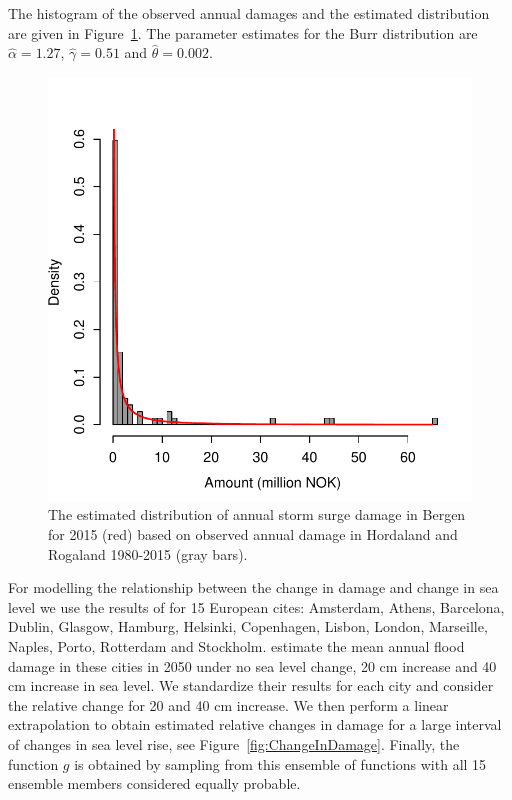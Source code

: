 \documentclass[draft,linenumbers]{agujournal}
\begin{document}
The histogram of the observed annual damages and the estimated distribution are given in Figure~\ref{fig:BergenDamageDist}. The parameter estimates for the Burr distribution are $\hat{\alpha} = 1.27$, $\hat{\gamma} = 0.51$ and $\hat{\theta} = 0.002$. 

\begin{figure}
\begin{center}
\includegraphics[width=0.5\linewidth]{DamageDistribution.pdf}
\caption{ The estimated distribution of annual storm surge damage in Bergen for 2015 (red) based on observed annual damage in Hordaland and Rogaland 1980-2015 (gray bars). }
\label{fig:BergenDamageDist}
\end{center}
\end{figure}


For modelling the relationship between the change in damage and change in sea level we use the results of \cite{Hallegatte&2013} for 15 European cites: Amsterdam, Athens, Barcelona, Dublin, Glasgow, Hamburg, Helsinki, Copenhagen, Lisbon, London, Marseille, Naples, Porto, Rotterdam and Stockholm. \cite{Hallegatte&2013} estimate the mean annual flood damage in these cities in 2050 under no sea level change, 20 cm increase and 40 cm increase in sea level. We standardize their results for each city and consider the relative change for 20 and 40 cm increase. We then perform a linear extrapolation to obtain estimated relative changes in damage for a large interval of changes in sea level rise, see Figure~\ref{fig:ChangeInDamage}. Finally, the function $g$ is obtained by sampling from this ensemble of functions with all 15 ensemble members considered equally probable. 
\end{document}
